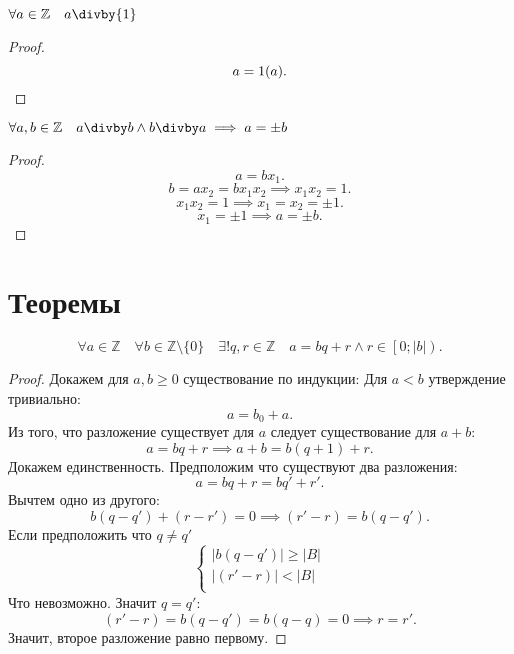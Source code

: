 \documentclass[11pt, oneside]{article}   	%
\begin{document}
    \begin{dlemma}
        $\forall{a\in \mathbb{Z}}\quad a\divby{1}$
        \begin{proof}
            \[ a = 1(a) .\qedhere\] 
        \end{proof}
    \end{dlemma}
    \begin{dlemma}
        $\forall{a, b\in \mathbb{Z}}\quad a\divby b\wedge b\divby a \implies a=\pm{b}$
        \begin{proof}
            \[ a = bx_1.\]
            \[ b = ax_2 = bx_1x_2\implies x_1x_2=1 .\]
            \[ x_1x_2=1\implies x_1=x_2=\pm{1} .\]
            \[ x_1=\pm{1}\implies a=\pm{b}.\]
        \end{proof}
    
    \end{dlemma}
\section{Теоремы}
    \begin{theorem}
        \[ \forall{a \in \mathbb{Z}}\quad\forall{b \in \mathbb{Z}\setminus\{0\}}\quad\exists!q, r \in \mathbb{Z}\quad a=bq + r\wedge r \in \left[0; |b|\right) .\]
        \begin{proof}
            Докажем для $a, b \ge 0$ существование по индукции: Для $a<b$ утверждение тривиально:
            \[ a=b_0+a .\] 
            Из того, что разложение существует для $a$ следует существование для  $a+b$:
            \[ a=bq+r \implies a+b=b\left( q+1 \right) +r .\] 
            Докажем единственность. Предположим что существуют два разложения:
                \[ a=bq+r=bq'+r' .\]
            Вычтем одно из другого:
            \[ b(q-q')+(r-r')=0\implies (r'-r)=b(q-q') .\]
            Если предположить что $q \neq q' $
            \[ 
                \begin{cases}
                   |b(q-q')|\ge |B|\\
                   |(r'-r)|< |B|\\
                \end{cases} 
            \] 
            Что невозможно. Значит $q=q'$:
            \[ (r'-r)=b(q-q')=b(q-q)=0\implies r=r' .\]
            Значит, второе разложение равно первому.
        \end{proof}
    \end{theorem}
\end{document}
